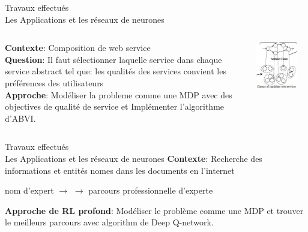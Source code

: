 \documentclass{beamer}
\begin{document}
{{\begin{frame}{Travaux effectués \\ Les Applications et les réseaux de neurones}
\begin{columns}
\begin{column}{0.6\textwidth}
	\textbf{Contexte}: Composition de web service\\
	\vspace{0.2cm}
	\textbf{Question}: Il faut sélectionner laquelle service dans chaque service abstract tel que: les qualités des services convient les préférences des utilisateurs%
\\	
	\vspace{0.2cm}
	\textbf{Approche}: Modéliser la probleme comme une MDP avec des objectives de qualité de service et Implémenter l'algorithme d'ABVI.
\end{column}
\begin{column}{0.4\textwidth}  %
    \begin{center}
     \includegraphics[width=0.8\textwidth]{images/web-service}
     \end{center}
\end{column}
\end{columns}

\end{frame}
\begin{frame}{Travaux effectués \\ Les Applications et les réseaux de neurones}
\textbf{Contexte}: Recherche des informations et entités nomes dans les documents en l'internet 
\begin{center}
 nom d'expert $\longrightarrow$  $\longrightarrow$ parcours professionnelle d'experte  
\end{center}
\textbf{Approche de RL profond}: Modéliser le problème comme une MDP et trouver le meilleurs parcours avec  algorithm de Deep Q-network. 


\end{frame}}}
\end{document}
